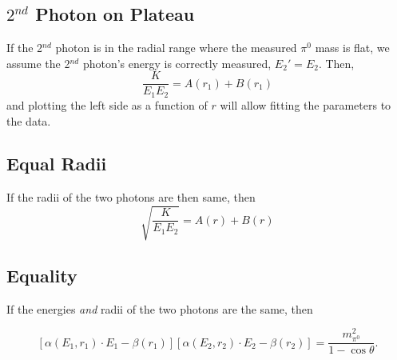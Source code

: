 \documentclass[amsmath,amssymb,notitlepage,11pt]{revtex4-1}
\begin{document}
\subsection{$2^{nd}$ Photon on Plateau}
If the 2$^{nd}$ photon is in the radial range where the measured $\pi^0$ mass is flat, we assume the 2$^{nd}$ photon's energy is correctly measured, $E_2'=E_2$.
Then,
\begin{equation}
    \frac{K}{E_1E_2}=A(r_1)+B(r_1)
    \label{}
\end{equation}
and plotting the left side as a function of $r$ will allow fitting the parameters to the data.

\subsection{Equal Radii}
If the radii of the two photons are then same, then
\begin{equation}
    \sqrt{\frac{K}{E_1E_2}}=A(r)+B(r)
    \label{}
\end{equation}

\subsection{Equality}
If the energies {\it and} radii of the two photons are the same, then

\begin{equation}
    \left[\alpha(E_1,r_1)\cdot E_1-\beta(r_1)\right]\left[\alpha(E_2,r_2)\cdot E_2-\beta(r_2)\right]=\frac{m^2_{\pi^0}}{1-\cos\theta}.
    \label{}
\end{equation}



\end{document}
